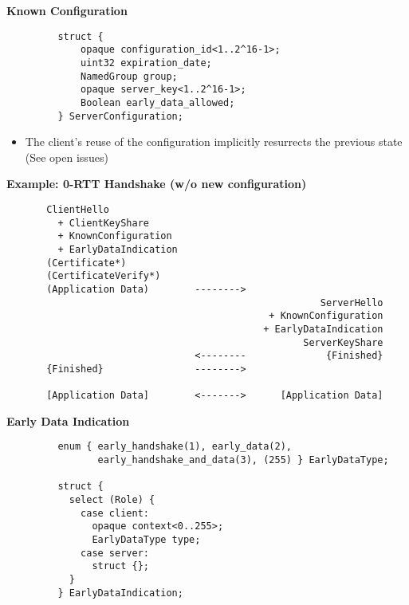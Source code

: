 \documentclass[helvetica]{seminar}
\newcommand{\heading}[1]{%
  \begin{center} 
    \large\bf 
    #1 
  \end{center} 
  \vspace{.4 in}}
\begin{document}
\begin{slide}
\heading{Known Configuration}

\begin{footnotesize}
\begin{verbatim}
         struct {
             opaque configuration_id<1..2^16-1>;
             uint32 expiration_date;
             NamedGroup group;
             opaque server_key<1..2^16-1>;
             Boolean early_data_allowed;
         } ServerConfiguration;
\end{verbatim}
\end{footnotesize}

\begin{itemize}
\item The client's reuse of the configuration implicitly resurrects the previous state (See open issues)
\end{itemize}

\end{slide}



\begin{slide}
\heading{Example: 0-RTT Handshake (w/o new configuration)}

\vspace{-4ex}
\begin{footnotesize}
\begin{verbatim}
       ClientHello
         + ClientKeyShare
         + KnownConfiguration
         + EarlyDataIndication
       (Certificate*)
       (CertificateVerify*)
       (Application Data)        -------->
                                                       ServerHello
                                              + KnownConfiguration
                                             + EarlyDataIndication
                                                    ServerKeyShare
                                 <--------              {Finished}
       {Finished}                -------->

       [Application Data]        <------->      [Application Data]
\end{verbatim}
\end{footnotesize}
\end{slide}


\begin{slide}
\heading{Early Data Indication}


\begin{footnotesize}
\begin{verbatim}
         enum { early_handshake(1), early_data(2),
                early_handshake_and_data(3), (255) } EarlyDataType;

         struct {
           select (Role) {
             case client:
               opaque context<0..255>;
               EarlyDataType type;
             case server:
               struct {};
           }
         } EarlyDataIndication;
\end{verbatim}
\end{footnotesize}
\end{slide}
\end{document}
